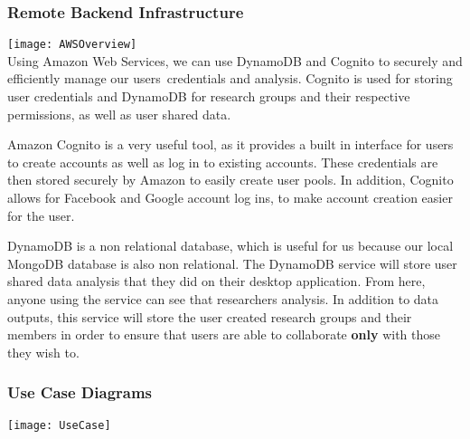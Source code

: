 \subsubsection{Remote Backend Infrastructure}
\texttt{[image: AWSOverview]} \\
Using Amazon Web Services, we can use DynamoDB and Cognito to securely and efficiently manage our users\textquotesingle\ credentials and analysis. Cognito is used for storing user credentials and DynamoDB for research groups and their respective permissions, as well as user shared data.\par
Amazon Cognito is a very useful tool, as it provides a built in interface for users to create accounts as well as log in to existing accounts. These credentials are then stored securely by Amazon to easily create user pools. In addition, Cognito allows for Facebook and Google account log ins, to make account creation easier for the user.\par
DynamoDB is a non relational database, which is useful for us because our local MongoDB database is also non relational. The DynamoDB service will store user shared data analysis that they did on their desktop application. From here, anyone using the service can see that researcher\textquotesingle s analysis. In addition to data outputs, this service will store the user created research groups and their members in order to ensure that users are able to collaborate \textbf{only} with those they wish to.

\subsubsection{Use Case Diagrams}
\begin{center}
    \texttt{[image: UseCase]}
\end{center}
\newpage